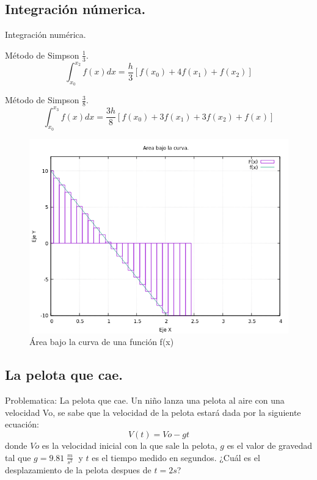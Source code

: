 \documentclass[12pt]{beamer}
\begin{document}
\subsection{Integración númerica.}
\begin{frame}{Integración numérica.}

Método de Simpson $\frac{1}{3}$.
\begin{equation}
\int _{x_{0}} ^{x_{2}} f(x) dx =  \dfrac{h}{3}[f(x_{0}) + 4f(x_{1}) + f(x_{2})]
\end{equation}

Método de Simpson $ \frac{3}{8}$.
\begin{equation}
\int_{x_{0}} ^{x_{3}} f(x) dx = \dfrac{3h}{8}[f(x_{0}) + 3f(x_{1}) + 3f(x_{2}) + f(x_{})]
\end{equation}

\end{frame}
\begin{frame}
\begin{figure}[H]
\centering
\includegraphics[scale=0.5]{simpson.png} 
\caption{Área bajo la curva de una función f(x)}
\end{figure}
\end{frame}


\subsection{La pelota que cae.}
\begin{frame}{Problematica: La pelota que cae.}
Un niño lanza una pelota al aire con una velocidad Vo, se sabe que la velocidad de la pelota estará dada por la siguiente ecuación:
$$ V(t) = Vo - gt $$
donde $Vo$ es la velocidad inicial con la que sale la pelota, $g$ es el valor de gravedad tal que $ g =  9.81 \; \frac{m}{s^{2}} \; $ y $t$ es el tiempo medido en segundos. ¿Cuál es el desplazamiento de la pelota despues de $t = 2 s$?
\end{frame}
\end{document}
